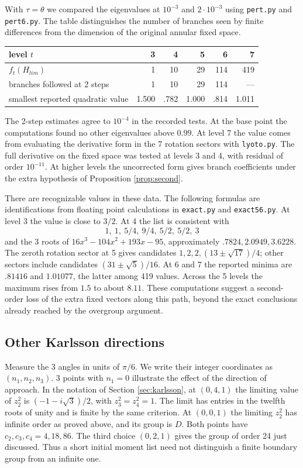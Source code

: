 \documentclass[11pt,a4paper]{amsart}
\begin{document}
With $\tau=\theta$ we compared the eigenvalues at $10^{-3}$ and $2\cdot10^{-3}$ using \texttt{pert.py} and \texttt{pert6.py}. The table distinguishes the number of branches seen by finite differences from the dimension of the original annular fixed space.
\begin{center}
\begin{tabular}{lrrrrr}
\toprule
level $t$&3&4&5&6&7\\ \midrule
$f_t(H_{lim})$&1&10&29&114&419\\
branches followed at 2 steps&1&10&29&114&---\\
smallest reported quadratic value&1.500&.782&1.000&.814&1.011\\ \bottomrule
\end{tabular}
\end{center}
The 2-step estimates agree to $10^{-4}$ in the recorded tests. At the base point the computations found no other eigenvalues above $0.99$. At level 7 the value comes from evaluating the derivative form in the 7 rotation sectors with \texttt{lyoto.py}. The full derivative on the fixed space was tested at levels 3 and 4, with residual of order $10^{-11}$. At higher levels the uncorrected form gives branch coefficients under the extra hypothesis of Proposition \ref{prop:second}.

There are recognizable values in these data. The following formulas are identifications from floating point calculations in \texttt{exact.py} and \texttt{exact56.py}. At level 3 the value is close to $3/2$. At 4 the list is consistent with
\[
 1,\ 1,\ 5/4,\ 9/4,\ 5/2,\ 5/2,\ 3
\]
and the 3 roots of $16x^3-104x^2+193x-95$, approximately $.7824,2.0949,3.6228$. The zeroth rotation sector at 5 gives candidates $1,2,2,(13\pm\sqrt{17})/4$; other sectors include candidates $(31\pm\sqrt5)/16$. At 6 and 7 the reported minima are $.81416$ and $1.01077$, the latter among 419 values. Across the 5 levels the maximum rises from $1.5$ to about $8.11$. These computations suggest a second-order loss of the extra fixed vectors along this path, beyond the exact conclusions already reached by the overgroup argument.

\subsection{Other Karlsson directions}\label{sec:other}
Measure the 3 angles in units of $\pi/6$. We write their integer coordinates as $(n_1,n_2,n_3)$. 3 points with $n_1=0$ illustrate the effect of the direction of approach. In the notation of Section \ref{sec:karlsson}, at $(0,4,1)$ the limiting value of $z_2^2$ is $(-1-i\sqrt3)/2$, with $z_3^2=z_4^2=1$. The limit has entries in the twelfth roots of unity and is finite by the same criterion. At $(0,0,1)$ the limiting $z_2^2$ has infinite order as proved above, and its group is $D$. Both points have $c_2,c_3,c_4=4,18,86$. The third choice $(0,2,1)$ gives the group of order 24 just discussed. Thus a short initial moment list need not distinguish a finite boundary group from an infinite one.
\end{document}
